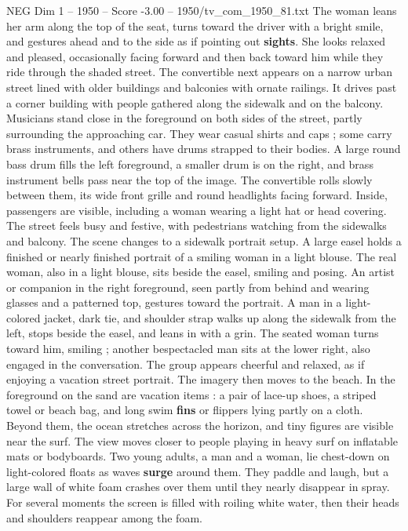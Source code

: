 \begin{textsample}{NEG Dim 1 – 1950 – Score -3.00 – 1950/tv\_com\_1950\_81.txt}
The woman leans her arm along the top of the seat, turns toward the driver with a bright smile, and gestures ahead and to the side as if pointing out \textbf{sights}.
She looks relaxed and pleased, occasionally facing forward and then back toward him while they ride through the shaded street.
The convertible next appears on a narrow urban street lined with older buildings and balconies with ornate railings.
It drives past a corner building with people gathered along the sidewalk and on the balcony.
Musicians stand close in the foreground on both sides of the street, partly surrounding the approaching car.
They wear casual shirts and caps ; some carry brass instruments, and others have drums strapped to their bodies.
A large round bass drum fills the left foreground, a smaller drum is on the right, and brass instrument bells pass near the top of the image.
The convertible rolls slowly between them, its wide front grille and round headlights facing forward.
Inside, passengers are visible, including a woman wearing a light hat or head covering.
The street feels busy and festive, with pedestrians watching from the sidewalks and balcony.
The scene changes to a sidewalk portrait setup.
A large easel holds a finished or nearly finished portrait of a smiling woman in a light blouse.
The real woman, also in a light blouse, sits beside the easel, smiling and posing.
An artist or companion in the right foreground, seen partly from behind and wearing glasses and a patterned top, gestures toward the portrait.
A man in a light-colored jacket, dark tie, and shoulder strap walks up along the sidewalk from the left, stops beside the easel, and leans in with a grin.
The seated woman turns toward him, smiling ; another bespectacled man sits at the lower right, also engaged in the conversation.
The group appears cheerful and relaxed, as if enjoying a vacation street portrait.
The imagery then moves to the beach.
In the foreground on the sand are vacation items : a pair of lace-up shoes, a striped towel or beach bag, and long swim \textbf{fins} or flippers lying partly on a cloth.
Beyond them, the ocean stretches across the horizon, and tiny figures are visible near the surf.
The view moves closer to people playing in heavy surf on inflatable mats or bodyboards.
Two young adults, a man and a woman, lie chest-down on light-colored floats as waves \textbf{surge} around them.
They paddle and laugh, but a large wall of white foam crashes over them until they nearly disappear in spray.
For several moments the screen is filled with roiling white water, then their heads and shoulders reappear among the foam.

\end{textsample}
